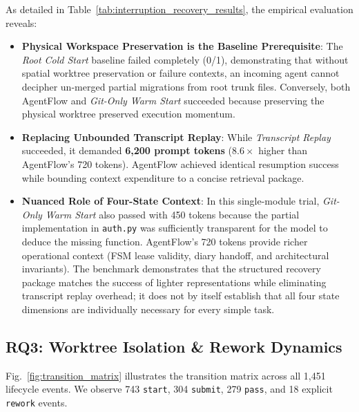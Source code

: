 \documentclass[conference]{IEEEtran}
\begin{document}
As detailed in Table~\ref{tab:interruption_recovery_results}, the empirical evaluation reveals:
\begin{itemize}
    \item \textbf{Physical Workspace Preservation is the Baseline Prerequisite}: The \textit{Root Cold Start} baseline failed completely (0/1), demonstrating that without spatial worktree preservation or failure contexts, an incoming agent cannot decipher un-merged partial migrations from root trunk files. Conversely, both AgentFlow and \textit{Git-Only Warm Start} succeeded because preserving the physical worktree preserved execution momentum.
    \item \textbf{Replacing Unbounded Transcript Replay}: While \textit{Transcript Replay} succeeded, it demanded \textbf{6,200 prompt tokens} ($8.6\times$ higher than AgentFlow's 720 tokens). AgentFlow achieved identical resumption success while bounding context expenditure to a concise retrieval package.
    \item \textbf{Nuanced Role of Four-State Context}: In this single-module trial, \textit{Git-Only Warm Start} also passed with 450 tokens because the partial implementation in \texttt{auth.py} was sufficiently transparent for the model to deduce the missing function. AgentFlow's 720 tokens provide richer operational context (FSM lease validity, diary handoff, and architectural invariants). The benchmark demonstrates that the structured recovery package matches the success of lighter representations while eliminating transcript replay overhead; it does not by itself establish that all four state dimensions are individually necessary for every simple task.
\end{itemize}

\subsection{RQ3: Worktree Isolation \& Rework Dynamics}
Fig.~\ref{fig:transition_matrix} illustrates the transition matrix across all 1,451 lifecycle events. We observe 743 \texttt{start}, 304 \texttt{submit}, 279 \texttt{pass}, and 18 explicit \texttt{rework} events.
\end{document}
